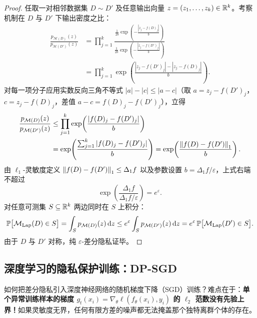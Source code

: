 \begin{proof}
任取一对相邻数据集 $D \sim D'$ 及任意输出向量 $z = (z_1,\dots,z_k) \in \mathbb{R}^k$。考察机制在 $D$ 与 $D'$ 下输出密度之比：
\begin{align*}
  \frac{p_{\mathcal{M}(D)}(z)}{p_{\mathcal{M}(D')}(z)}
  &= \prod_{j=1}^k \frac{\frac{1}{2b}\exp\!\left(-\frac{|z_j - f(D)_j|}{b}\right)}{\frac{1}{2b}\exp\!\left(-\frac{|z_j - f(D')_j|}{b}\right)} \\
  &= \prod_{j=1}^k \exp\!\left(\frac{|z_j - f(D')_j| - |z_j - f(D)_j|}{b}\right).
\end{align*}
对每一项分子应用实数反向三角不等式 $|a| - |c| \le |a - c|$（取 $a = z_j - f(D')_j$，$c = z_j - f(D)_j$，差值 $a - c = f(D)_j - f(D')_j$），立得
\begin{align*}
  \frac{p_{\mathcal{M}(D)}(z)}{p_{\mathcal{M}(D')}(z)}
  &\le \prod_{j=1}^k \exp\!\left(\frac{|f(D)_j - f(D')_j|}{b}\right) \\
  &= \exp\!\left(\frac{\sum_{j=1}^k |f(D)_j - f(D')_j|}{b}\right)
   = \exp\!\left(\frac{\left\|f(D) - f(D')\right\|_1}{b}\right).
\end{align*}
由 $\ell_1$-灵敏度定义 $\left\|f(D) - f(D')\right\|_1 \le \Delta_1 f$ 以及参数设置 $b = \Delta_1 f / \varepsilon$，上式右端不超过
\[
  \exp\!\left(\frac{\Delta_1 f}{\Delta_1 f / \varepsilon}\right) = e^{\varepsilon}.
\]
对任意可测集 $S \subseteq \mathbb{R}^k$ 两边同时在 $S$ 上积分：
\[
  \mathbb{P}\big[\mathcal{M}_{\mathrm{Lap}}(D) \in S\big]
  = \int_S p_{\mathcal{M}(D)}(z)\,\mathrm{d}z
  \le e^{\varepsilon} \int_S p_{\mathcal{M}(D')}(z)\,\mathrm{d}z
  = e^{\varepsilon}\,\mathbb{P}\big[\mathcal{M}_{\mathrm{Lap}}(D') \in S\big].
\]
由于 $D$ 与 $D'$ 对称，纯 $\varepsilon$-差分隐私证毕。
\end{proof}

\subsection{深度学习的隐私保护训练：DP-SGD}

如何把差分隐私引入深度神经网络的随机梯度下降（SGD）训练？难点在于：\textbf{单个异常训练样本的梯度 $g_t(x_i) = \nabla_\theta \ell(f_\theta(x_i), y_i)$ 的 $\ell_2$ 范数没有先验上界！}如果灵敏度无界，任何有限方差的噪声都无法掩盖那个独特离群个体的存在。

